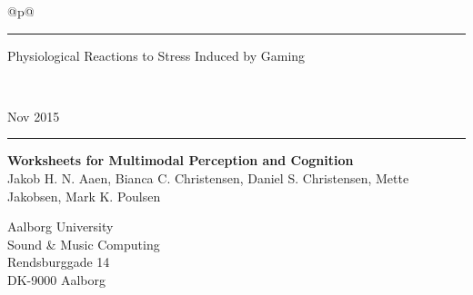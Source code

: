 \def\navnA{Jakob H. N. Aaen}\def\navnB{Bianca C. Christensen}\def\navnC{Daniel S. Christensen}\def\navnD{Mette Jakobsen}\def\navnE{Mark K. Poulsen}

\thispagestyle{empty}
\noindent%
\begin{tabular}{@{}p{\textwidth}@{}}
    \rule{\linewidth}{2mm}\vspace{1.5cm}
    \vspace*{-15mm}
    \begin{flushleft}
        \linespread{0.7}
        \fontsize{50}{60}\selectfont\sffamily
		Physiological Reactions to Stress Induced by Gaming
    \end{flushleft} \\[5mm] 
    \raggedright{
        \fontsize{30}{40}\selectfont\sffamily
        Nov 2015\\ \vspace*{1mm}
    }
    \rule{\linewidth}{.7mm}
\end{tabular}
\begin{flushleft}
  {\Huge\sffamily\bfseries
      	Worksheets for Multimodal Perception and Cognition
  }\\
  \vspace{0.2cm}
  {\LARGE\sffamily
	    \navnA, \navnB, \navnC, \navnD, \navnE
  }
\end{flushleft}
\vfill
\begin{flushleft}\sffamily\large
  Aalborg University\\
  Sound \& Music Computing\\
  Rendsburggade 14\\
  DK-9000 Aalborg
\end{flushleft}
